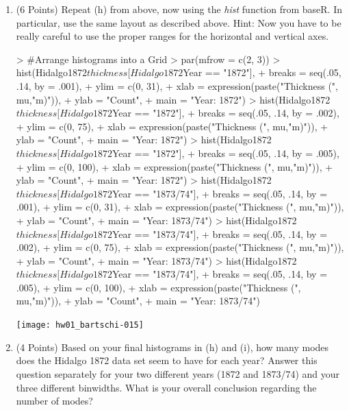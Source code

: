 \documentclass[12pt,letterpaper,final]{article}
\begin{document}
\begin{enumerate}
\begin{enumerate}
\item (6 Points) 
Repeat (h) from above, now using the {\it hist} function from baseR.
In particular, use the same layout as described above.
Hint: Now you have to be really careful to use the proper ranges
for the horizontal and vertical axes.

\begin{Schunk}
\begin{Sinput}
> #Arrange histograms into a Grid
> par(mfrow = c(2, 3))
> hist(Hidalgo1872$thickness[Hidalgo1872$Year == "1872"],
+   breaks = seq(.05, .14, by = .001),
+   ylim = c(0, 31),
+   xlab = expression(paste("Thickness (", mu,"m)")),
+   ylab = "Count",
+   main = "Year: 1872")
> hist(Hidalgo1872$thickness[Hidalgo1872$Year == "1872"],
+   breaks = seq(.05, .14, by = .002),
+   ylim = c(0, 75),
+   xlab = expression(paste("Thickness (", mu,"m)")),
+   ylab = "Count",
+   main = "Year: 1872")
> hist(Hidalgo1872$thickness[Hidalgo1872$Year == "1872"],
+   breaks = seq(.05, .14, by = .005),
+   ylim = c(0, 100),
+   xlab = expression(paste("Thickness (", mu,"m)")),
+   ylab = "Count",
+   main = "Year: 1872")
> hist(Hidalgo1872$thickness[Hidalgo1872$Year == "1873/74"],
+   breaks = seq(.05, .14, by = .001),
+   ylim = c(0, 31),
+   xlab = expression(paste("Thickness (", mu,"m)")),
+   ylab = "Count",
+   main = "Year: 1873/74")
> hist(Hidalgo1872$thickness[Hidalgo1872$Year == "1873/74"],
+   breaks = seq(.05, .14, by = .002),
+   ylim = c(0, 75),
+   xlab = expression(paste("Thickness (", mu,"m)")),
+   ylab = "Count",
+   main = "Year: 1873/74")
> hist(Hidalgo1872$thickness[Hidalgo1872$Year == "1873/74"],
+   breaks = seq(.05, .14, by = .005),
+   ylim = c(0, 100),
+   xlab = expression(paste("Thickness (", mu,"m)")),
+   ylab = "Count",
+   main = "Year: 1873/74")
\end{Sinput}
\end{Schunk}
\texttt{[image: hw01\_bartschi-015]}


\item (4 Points)
Based on your final histograms in (h) and (i), how many modes does the Hidalgo 1872 data set
seem to have for each year? Answer this question separately for your two different years
(1872 and 1873/74) and your three different binwidths.
What is your overall conclusion regarding the number of modes?


\end{enumerate}
\end{enumerate}
\end{document}
